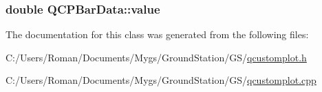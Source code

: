 \subsubsection[{value}]{\setlength{\rightskip}{0pt plus 5cm}double Q\+C\+P\+Bar\+Data\+::value}\label{class_q_c_p_bar_data_acab57005d8916d61b64e9ddef6113b60}


The documentation for this class was generated from the following files\+:\begin{DoxyCompactItemize}
\item 
C\+:/\+Users/\+Roman/\+Documents/\+Mygs/\+Ground\+Station/\+G\+S/\hyperlink{qcustomplot_8h}{qcustomplot.\+h}\item 
C\+:/\+Users/\+Roman/\+Documents/\+Mygs/\+Ground\+Station/\+G\+S/\hyperlink{qcustomplot_8cpp}{qcustomplot.\+cpp}\end{DoxyCompactItemize}
